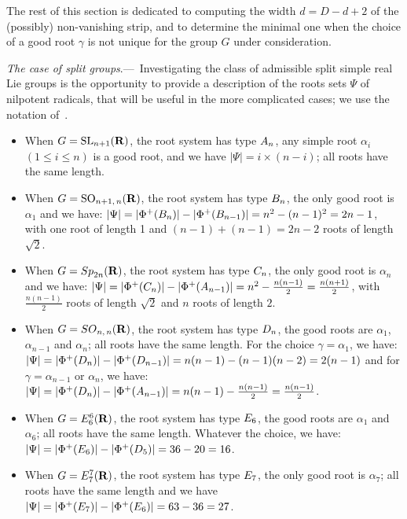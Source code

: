\documentclass[11pt]{article}
\theoremstyle{definition}
\numberwithin{equation}{section}
\numberwithin{figure}{section}
\numberwithin{table}{section}
\DeclareMathOperator{\SL}{SL}
\DeclareMathOperator{\SO}{SO}
\begin{document}

The rest of this section is dedicated to computing the width $d = D-d+2$ of the (possibly) non-vanishing strip, and to determine the minimal one when the choice of a good root $\gamma$ is not unique for the group $G$ under consideration.


\emph{The case of split groups}.---~Investigating the class of admissible split simple real Lie groups is the opportunity to provide a description of the roots sets $\Psi$ of nilpotent radicals, that will be useful in the more complicated cases; we use the notation of~\cite[Planches]{BBK-Lie-4to6}.
\begin{itemize}
\item When $G = {\SL}_{n+1}({\bf R})$, the root system has type ${\rm A}_n$, any simple root $\alpha_i$ $(1 \leqslant i \leqslant n)$ is a good root, and we have $|\Psi| = i \times (n-i)$; all roots have the same length.
\item When $G = {\SO}_{n+1,\,n}({\bf R})$, the root system has type ${\rm B}_n$, the only good root is $\alpha_1$ and we have: $|\Psi| = |\Phi^+({\rm B}_n)|-|\Phi^+({\rm B}_{n-1})|=n^2 -(n-1)^2=2n-1$, with one root of length 1 and $(n-1)+(n-1)=2n-2$ roots of length $\sqrt{2}$.
\item When $G = {\rm Sp}_{2n}({\bf R})$, the root system has type ${\rm C}_n$, the only good root is $\alpha_n$ and we have: $|\Psi| = |\Phi^+({\rm C}_n)|-|\Phi^+({\rm A}_{n-1})|=n^2 -\frac{n(n-1)}{2}=\frac{n(n+1)}{2}$, with $\frac{n(n-1)}{2}$ roots of length $\sqrt{2}$ and $n$ roots of length $2$.
\item When $G = {\rm SO}_{n,\,n}({\bf R})$, the root system has type ${\rm D}_n$, the good roots are $\alpha_1$, $\alpha_{n-1}$ and $\alpha_n$; all roots have the same length. For the choice $\gamma=\alpha_1$, we have: $|\Psi| = |\Phi^+({\rm D}_n)|-|\Phi^+({\rm D}_{n-1})|=n(n-1)-(n-1)(n-2)=2(n-1)$ and for $\gamma=\alpha_{n-1}$ or $\alpha_n$, we have: $|\Psi| = |\Phi^+({\rm D}_n)|-|\Phi^+({\rm A}_{n-1})| = n(n-1) - \frac{n(n-1)}{2}\linebreak= \frac{n(n-1)}{2}$.
\item When $G = {\rm E}_6^6({\bf R})$, the root system has type ${\rm E}_6$, the good roots are $\alpha_1$ and $\alpha_6$; all roots have the same length. Whatever the choice, we have:\linebreak$|\Psi| = |\Phi^+({\rm E}_6)|-|\Phi^+({\rm D}_5)| = 36-20 = 16$.
\item When $G = {\rm E}_7^7({\bf R})$, the root system has type ${\rm E}_7$, the only good root is $\alpha_7$; all roots have the same length and we have $|\Psi| = |\Phi^+({\rm E}_7)|-|\Phi^+({\rm E}_6)|\linebreak= 63-36= 27$.
\end{itemize}
\end{document}

